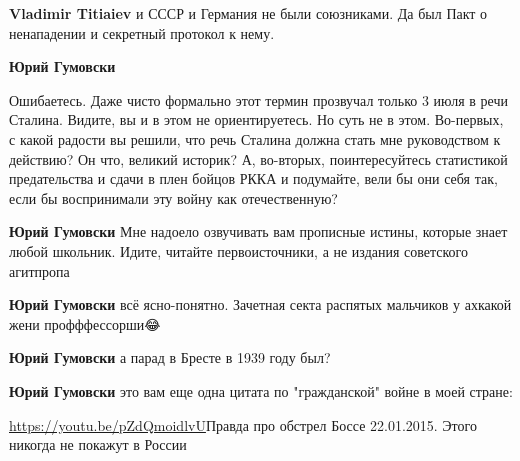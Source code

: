 \begin{itemize}
\begin{itemize}

\textbf{Vladimir Titiaiev} и СССР и Германия не были союзниками. Да был Пакт о ненападении и секретный протокол к нему.


\textbf{Юрий Гумовски} 

Ошибаетесь. Даже чисто формально этот термин прозвучал только 3 июля в речи
Сталина. Видите, вы и в этом не ориентируетесь. Но суть не в этом. Во-первых, с
какой радости вы решили, что речь Сталина должна стать мне руководством к
действию? Он что, великий историк? А, во-вторых, поинтересуйтесь статистикой
предательства и сдачи в плен бойцов РККА и подумайте, вели бы они себя так,
если бы воспринимали эту войну как отечественную?



\textbf{Юрий Гумовски} Мне надоело озвучивать вам прописные истины, которые
знает любой школьник. Идите, читайте первоисточники, а не издания советского
агитпропа


\textbf{Юрий Гумовски} всё ясно-понятно. Зачетная секта распятых мальчиков у ахкакой жени профффессорши😂


\textbf{Юрий Гумовски} а парад в Бресте в 1939 году был?


\textbf{Юрий Гумовски} это вам еще одна цитата по "гражданской" войне в моей стране:

\url{https://youtu.be/pZdQmoidlvU}{Правда про обстрел Боссе 22.01.2015. Этого никогда не покажут в России}



\end{itemize}
\end{itemize}
